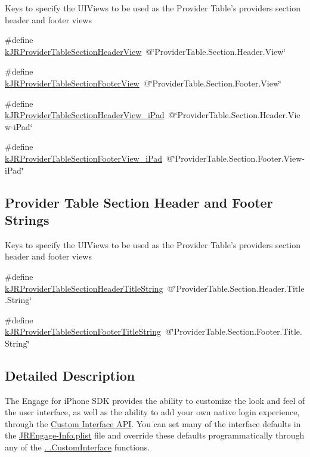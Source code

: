 Keys to specify the UIViews to be used as the Provider Table's providers section header and footer views \begin{DoxyCompactItemize}
\item 
\#define \hyperlink{group__custom_interface_gaaff8ebdd2b9badb1d0a019a71d47db46}{kJRProviderTableSectionHeaderView}~@\char`\"{}ProviderTable.Section.Header.View\char`\"{}
\item 
\#define \hyperlink{group__custom_interface_ga984c096e9258dea402a1c27ae8bb6c8f}{kJRProviderTableSectionFooterView}~@\char`\"{}ProviderTable.Section.Footer.View\char`\"{}
\item 
\#define \hyperlink{group__custom_interface_ga7dcb3488390fabe1f3a358fb5af1e42c}{kJRProviderTableSectionHeaderView\_\-iPad}~@\char`\"{}ProviderTable.Section.Header.View-\/iPad\char`\"{}
\item 
\#define \hyperlink{group__custom_interface_gaa2196cc44d4e0dc4de9e98248c8a7e10}{kJRProviderTableSectionFooterView\_\-iPad}~@\char`\"{}ProviderTable.Section.Footer.View-\/iPad\char`\"{}
\end{DoxyCompactItemize}
\subsection*{Provider Table Section Header and Footer Strings}
\label{_amgrp04b2524ada266b7d80839ac3b6e6ae59}
 \label{group__custom_interface_tableSectionStrings}
\hypertarget{group__custom_interface_tableSectionStrings}{}


Keys to specify the UIViews to be used as the Provider Table's providers section header and footer views \begin{DoxyCompactItemize}
\item 
\#define \hyperlink{group__custom_interface_ga667a6c955993ec24292875f319a7d763}{kJRProviderTableSectionHeaderTitleString}~@\char`\"{}ProviderTable.Section.Header.Title.String\char`\"{}
\item 
\#define \hyperlink{group__custom_interface_ga72e63105251e7d4d6a363e279c2bf775}{kJRProviderTableSectionFooterTitleString}~@\char`\"{}ProviderTable.Section.Footer.Title.String\char`\"{}
\end{DoxyCompactItemize}


\subsection{Detailed Description}
The Engage for iPhone SDK provides the ability to customize the look and feel of the user interface, as well as the ability to add your own native login experience, through the \hyperlink{interface_j_r_engage_customInterface}{Custom Interface API}. You can set many of the interface defaults in the \hyperlink{_j_r_engage-_info_8plist}{JREngage-\/Info.plist} file and override these defaults programmatically through any of the \hyperlink{interface_j_r_engage_showMethods}{...CustomInterface} functions.

